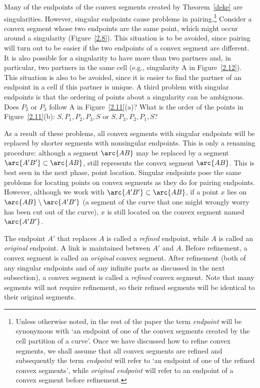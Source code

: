 Many of the endpoints of the convex segments created by Theorem~\ref{deke} 
are singularities.  However, singular endpoints
cause problems in pairing.\footnote{Unless otherwise noted, in the rest of the paper
	the term {\em endpoint} will be synonymous with 
	`an endpoint of one of 
	the convex segments created by the cell partition of a curve'.
	Once we have discussed how to refine convex segments, we shall
	assume that all convex segments are refined and subsequently
	the term {\em endpoint} will refer to 
	`an endpoint of one of the refined convex segments', while
	{\em original endpoint} will refer to
	an endpoint of a convex segment before refinement.}
Consider a convex segment whose two endpoints are the same point,
which might occur around a singularity (Figure~\ref{2.8}).
This situation is to be avoided, since pairing will turn out to be easier if 
the two endpoints of a convex segment are different.
It is also possible for a singularity to have more than two
partners and, in particular, two partners in the same cell (e.g., singularity 
A in Figure~\ref{2.12}).
This situation is also to be avoided, since it is easier to find the partner 
of an endpoint in a cell if this partner is unique.
A third problem with singular endpoints is that the ordering of points about
a singularity can be ambiguous.
Does $P_{2}$ or $P_{3}$ follow A in Figure~\ref{2.11}(a)?
What is the order of the points in Figure~\ref{2.11}(b): 
$S, P_{1}, P_{2}, P_{3}, S$ or $S, P_{3}, P_{2}, P_{1}, S$?


As a result of these problems, all convex segments with singular endpoints 
will be replaced by shorter segments with nonsingular endpoints.
This is only a renaming procedure: although a segment $\arc{AB}$ may be replaced
by a segment $\arc{A'B'} \subset \arc{AB}$,
 still represents the convex segment $\arc{AB}$.
This is best seen in the next phase, point location.
Singular endpoints pose the same problems for locating points on convex segments as they
do for pairing endpoints.
However, although we work with $\arc{A'B'} \subset \arc{AB}$, if a point $x$ lies 
on $\arc{AB} \setminus \arc{A'B'}$ (a segment of the curve that
one might wrongly worry has been cut out of the curve),
$x$ is still located on the convex segment named $\arc{A'B'}$.

The endpoint $A'$ that replaces $A$ is called a {\em refined} endpoint,
while $A$ is called an {\em original} endpoint.
A link is maintained between $A'$ and $A$.
Before refinement, a convex segment is called an {\em original} convex segment.
After refinement (both of any singular endpoints and of any infinite parts as discussed in 
the next subsection), a convex segment is called a {\em refined} convex segment.
Note that many segments will not require refinement, so their refined segments
will be identical to their original segments.

